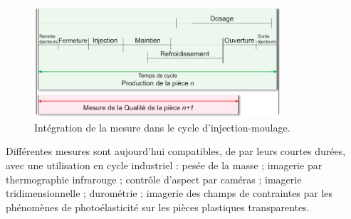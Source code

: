 \begin{figure}[tbhp]
	\centering
	\includegraphics[width=0.82\textwidth,height=\textheight,keepaspectratio]{../Chap1/Figures/SAPRISTI_Chronogramme-Simple.pdf}
	\caption{Intégration de la mesure dans le cycle d'injection-moulage.}
	\label{fig:time_constraint}
\end{figure}

Différentes mesures sont aujourd'hui compatibles, de par leurs courtes durées, avec une utilisation en cycle industriel : pesée de la masse ; imagerie par thermographie infrarouge ; contrôle d'aspect par caméras ; imagerie tridimensionnelle \cite{schwenke_optical_2002} ; durométrie ; imagerie des champs de contraintes par les phénomènes de photoélasticité sur les pièces plastiques transparentes.



